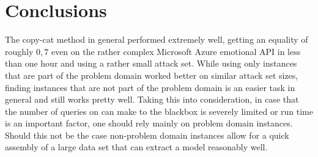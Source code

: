 \documentclass[a4paper,11pt]{article}
\begin{document}
\section{Conclusions}
    The copy-cat method in general performed extremely well, getting an equality of roughly $0,7$ even on the rather complex Microsoft Azure emotional API in less than one hour and using a rather small attack set. While using only instances that are part of the problem domain worked better on similar attack set sizes, finding instances that are not part of the problem domain is an easier task in general and still works pretty well. Taking this into consideration, in case that the number of queries on can make to the blackbox is severely limited or run time is an important factor, one should rely mainly on problem domain instances. Should this not be the case non-problem domain instances allow for a quick assembly of a large data set that can extract a model reasonably well.

\printbibliography
\end{document}
